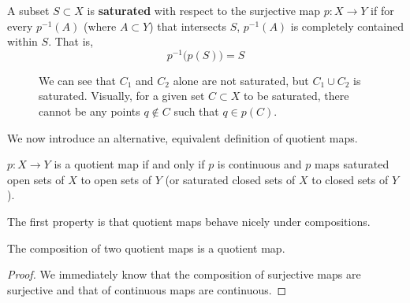     \begin{definition}[Saturation]
      A subset $S \subset X$ is \textbf{saturated} with respect to the surjective map $p: X \rightarrow Y$ if for every $p^{-1} (A)$ (where $A \subset Y$) that intersects $S$, $p^{-1}(A)$ is completely contained within $S$. That is, 
      \begin{equation}
        p^{-1} \big( p(S) \big) = S
      \end{equation}

      \begin{figure}[H]
        \centering 
        \caption{We can see that $C_1$ and $C_2$ alone are not saturated, but $C_1 \cup C_2$ is saturated. Visually, for a given set $C \subset X$ to be saturated, there cannot be any points $q \not\in C$ such that $q \in p(C)$. }
        \label{fig:saturation}
      \end{figure}
    \end{definition}

    We now introduce an alternative, equivalent definition of quotient maps. 

    \begin{theorem}
      $p: X \rightarrow Y$ is a quotient map if and only if $p$ is continuous and $p$ maps saturated open sets of $X$ to open sets of $Y$ (or saturated closed sets of $X$ to closed sets of $Y$). 
    \end{theorem} 

    The first property is that quotient maps behave nicely under compositions. 

    \begin{theorem}
      The composition of two quotient maps is a quotient map. 
    \end{theorem}
    \begin{proof}
      We immediately know that the composition of surjective maps are surjective and that of continuous maps are continuous. 
    \end{proof}

